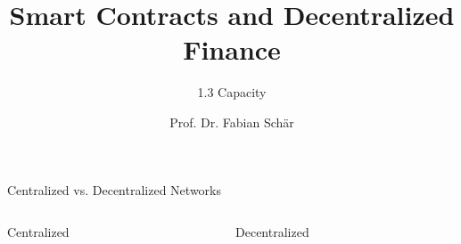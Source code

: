 \documentclass[handout]{beamer}
\title{Smart Contracts and Decentralized Finance}
\subtitle{1.3 Capacity}
\author{Prof. Dr. Fabian Schär}
\institute{University of Basel}
\begin{document}
\thispagestyle{empty}
\begin{frame}[noframenumbering]
	\titlepage
\end{frame}


\begin{frame}{Centralized vs. Decentralized Networks}
	\begin{columns}
		\begin{column}{0.5\textwidth}
			\begin{center}
				Centralized
			\end{center}
		\end{column}
		\begin{column}{0.5\textwidth}
			\begin{center}
				Decentralized
			\end{center}
		\end{column}
	\end{columns}
	\vspace{.8 cm}
	\begin{columns}[T]
		\begin{column}{0.5\textwidth}
			\begin{tikzpicture}[scale=0.7, every node/.style={scale=0.7}]
				
			\end{tikzpicture}
		\end{column}
		\begin{column}{0.5\textwidth}
			\begin{tikzpicture}[scale=0.7, every node/.style={scale=0.7}]
				
				
			\end{tikzpicture}
		\end{column}
	\end{columns}
\end{frame}
\end{document}
